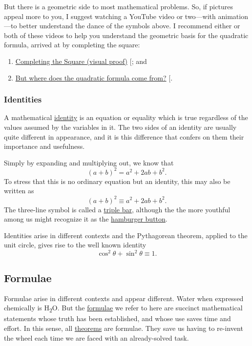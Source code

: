 \documentclass[
  a4paper,
]{article}
\begin{document}
But there is a geometric side to most mathematical problems. So, if
pictures appeal more to you, I suggest watching a YouTube video or
two---with animation---to better understand the dance of the symbols
above. I recommend either or both of these videos to help you understand
the geometric basis for the quadratic formula, arrived at by completing
the square:

\begin{enumerate}
\def\labelenumi{\alph{enumi}.}
\item
  \href{https://www.youtube.com/watch?v=T0HyWIFbsHQ}{Completing the
  Square (visual proof)} {[}\citeproc{ref-mvp-2022}{2}{]}; and
\item
  \href{https://www.youtube.com/watch?v=7Q4h1YTYgnE}{But where does the
  quadratic formula come from?}
  {[}\citeproc{ref-foggy-maths-2023}{3}{]}.
\end{enumerate}

\subsubsection{Identities}\label{identities}

A mathematical
\href{https://en.wikipedia.org/wiki/Identity_(mathematics)}{identity} is
an equation or equality which is true regardless of the values assumed
by the variables in it. The two sides of an identity are usually quite
different in appearance, and it is this difference that confers on them
their importance and usefulness.

Simply by expanding and multiplying out, we know that \[
(a+b)^2 = a^2 +2ab + b^2. 
\] To stress that this is no ordinary equation but an identity, this may
also be written as \[
(a+b)^2 \equiv a^2 +2ab + b^2.
\] The three-line symbol is called a
\href{https://en.wikipedia.org/wiki/Triple_bar}{triple bar}, although
the the more youthful among us might recognize it as the
\href{https://en.wikipedia.org/wiki/Hamburger_button}{hamburger button}.

Identities arise in different contexts and the Pythagorean theorem,
applied to the unit circle, gives rise to the well known identity \[
\cos^2\theta + \sin^2\theta \equiv 1.
\]

\subsection{Formulae}\label{formulae}

Formulae arise in different contexts and appear different. Water when
expressed chemically is H\textsubscript{\(2\)}O. But the
\href{https://en.wikipedia.org/wiki/Formula}{formulae} we refer to here
are succinct mathematical statements whose truth has been established,
and whose use saves time and effort. In this sense, all
\href{https://en.wikipedia.org/wiki/Formula}{theorems} are formulae.
They save us having to re-invent the wheel each time we are faced with
an already-solved task.
\end{document}
